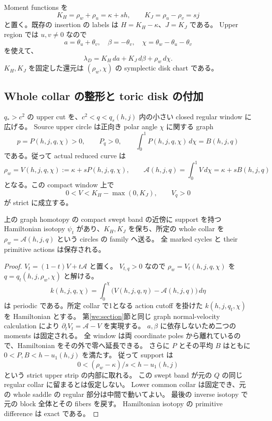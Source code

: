 Moment functions を
\begin{equation}\label{kc:moments}
 K_H=\rho_w+\rho_u=\kappa+sh,
 \qquad K_J=\rho_u-\rho_v=sj
\end{equation}
と置く。既存の insertion の labels は $H=K_H-\kappa$、$J=K_J$ である。
Upper region では $u,v\ne0$ なので
\[
 a=\theta_u+\theta_v,\quad \beta=-\theta_v,
 \quad\chi=\theta_w-\theta_u-\theta_v
\]
を使えて、
\begin{equation}\label{kc:upper-chart}
 \lambda_D=K_H\,da+K_J\,d\beta+\rho_w\,d\chi.
\end{equation}
$K_H,K_J$ を固定した還元は $(\rho_w,\chi)$ の symplectic disk chart である。

\subsection{Whole collar の整形と toric disk の付加}

$q_*>c^2$ の upper cut を、$c^2<q<q_s(h,j)$ 内の小さい closed regular window に広げる。
Source upper circle は正向き polar angle $\chi$ に関する graph
\[
 p=P(h,j,q,\chi)>0,\qquad P_q>0,
 \qquad \int_0^1P(h,j,q,\chi)\,d\chi=B(h,j,q)
\]
である。従って actual reduced curve は
\begin{equation}\label{kc:actual-graph}
 \rho_w=V(h,j,q,\chi):=\kappa+sP(h,j,q,\chi),
 \qquad \mathcal A(h,j,q)=\int_0^1V\,d\chi=\kappa+sB(h,j,q)
\end{equation}
となる。この compact window 上で
\[
 0<V<K_H-\max(0,K_J),\qquad V_q>0
\]
が strict に成立する。

\begin{lemma}\label{kc:straightening}
上の graph homotopy の compact swept band の近傍に support を持つ Hamiltonian isotopy
$\psi_t$ があり、$K_H,K_J$ を保ち、所定の whole collar を
$\rho_w=\mathcal A(h,j,q)$ という circles の family へ送る。
全 marked cycles と their primitive actions は保存される。
\end{lemma}

\begin{proof}
$V_t=(1-t)V+t\mathcal A$ と置く。
$V_{t,q}>0$ なので $\rho_w=V_t(h,j,q,\chi)$ を $q=q_t(h,j,\rho_w,\chi)$ と解ける。
\[
 k(h,j,q,\chi)=\int_0^\chi\bigl(V(h,j,q,\eta)-\mathcal A(h,j,q)\bigr)\,d\eta
\]
は periodic である。所定 collar で1となる action cutoff を掛けた
$k(h,j,q_t,\chi)$ を Hamiltonian とする。
第\ref{we:section}節と同じ graph normal-velocity calculation により
$\partial_tV_t=\mathcal A-V$ を実現する。
$a,\beta$ に依存しないため二つの moments は固定される。
全 window は両 coordinate poles から離れているので、Hamiltonian をその外で零へ延長できる。
さらに $P$ とその平均 $B$ はともに $0<P,B<h-u_1(h,j)$ を満たす。
従って support は
\[
 0<(\rho_w-\kappa)/s<h-u_1(h,j)
\]
という strict upper strip の内部に取れる。
この swept band が元の $Q$ の同じ regular collar に留まるとは仮定しない。
Lower common collar は固定でき、元の whole saddle の regular 部分は中間で動いてよい。
最後の inverse isotopy で元の block 全体とその fibers を戻す。
Hamiltonian isotopy の primitive difference は exact である。
\end{proof}

